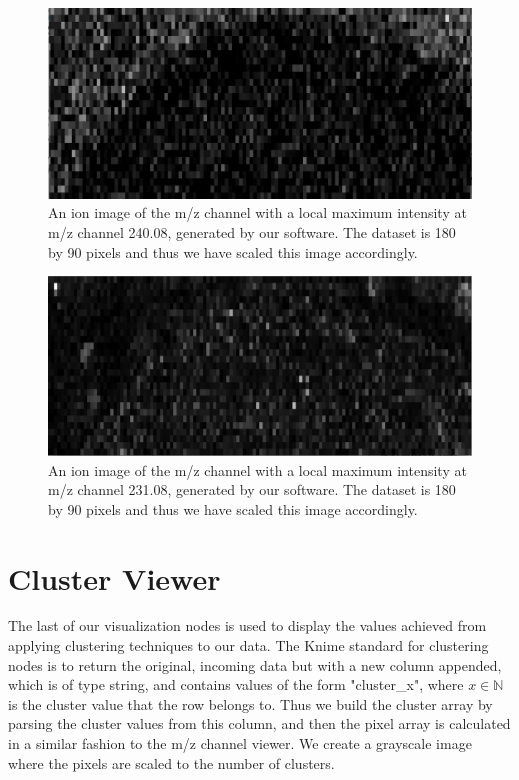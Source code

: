 \documentclass[11pt,openany]{book}
\begin{document}
\begin{figure}
    \centering
    \includegraphics[width = \textwidth]{./images/ion_images/urinarybladder_ion_image_mz240_08.png}
    \caption{An ion image of the m/z channel with a local maximum intensity at m/z channel 240.08, generated by our software. The dataset is 180 by 90 pixels and thus we have scaled this image accordingly.}
    \label{fig:ion_image_240.08}
\end{figure}

\begin{figure}
    \centering
    \includegraphics[width = \textwidth]{./images/ion_images/urinarybladder_ionimage_mz231.png}
    \caption{An ion image of the m/z channel with a local maximum intensity at m/z channel 231.08, generated by our software. The dataset is 180 by 90 pixels and thus we have scaled this image accordingly.}
    \label{fig:ion_image_231}
\end{figure}
    
\section{Cluster Viewer}
The last of our visualization nodes is used to display the values achieved from applying clustering techniques to our data. The Knime standard for clustering nodes is to return the original, incoming data but with a new column appended, which is of type string, and contains values of the form "cluster\_x", where $x \in \mathbb{N}$ is the cluster value that the row belongs to. Thus we build the cluster array by parsing the cluster values from this column, and then the pixel array is calculated in a similar fashion to the m/z channel viewer. We create a grayscale image where the pixels are scaled to the number of clusters.
\end{document}

